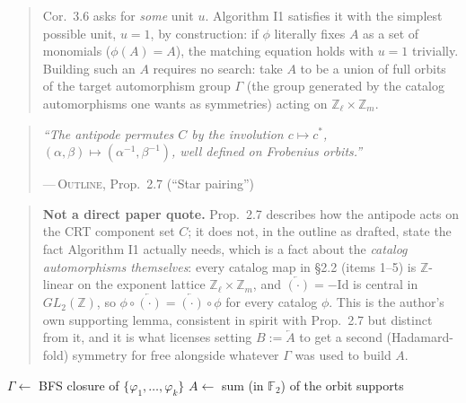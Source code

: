 \documentclass[11pt]{article}
\theoremstyle{plain}
\theoremstyle{definition}
\newenvironment{paperquote}[1]{%
  \def\paperquotecite{#1}%
  \begin{quotation}\noindent\itshape\small
}{%
  \normalfont\par\hfill---\,\textsc{Outline}, \paperquotecite\medskip
  \end{quotation}
}
\newcommand{\pq}[2]{\begin{paperquote}{#1}#2\end{paperquote}}
\newenvironment{mynote}{%
  \begin{quotation}\noindent\small
}{%
  \end{quotation}
}
\begin{document}
\begin{mynote}
Cor.\ 3.6 asks for \emph{some} unit $u$. Algorithm I1 satisfies it with the
simplest possible unit, $u=1$, by construction: if $\phi$ literally fixes
$A$ as a set of monomials ($\phi(A)=A$), the matching equation holds with
$u=1$ trivially. Building such an $A$ requires no search: take $A$ to be a
union of full orbits of the target automorphism group $\Gamma$ (the group
generated by the catalog automorphisms one wants as symmetries) acting on
$\mathbb{Z}_\ell\times\mathbb{Z}_m$.
\end{mynote}

\pq{Prop.\ 2.7 (``Star pairing'')}{%
``The antipode permutes $C$ by the involution $c\mapsto c^*$, $(\alpha,
\beta)\mapsto(\alpha^{-1},\beta^{-1})$, well defined on Frobenius
orbits.''
}

\begin{mynote}
\textbf{Not a direct paper quote.} Prop.\ 2.7 describes how the antipode
acts on the CRT component set $C$; it does not, in the outline as drafted,
state the fact Algorithm I1 actually needs, which is a fact about the
\emph{catalog automorphisms themselves}: every catalog map in \S2.2 (items
1--5) is $\mathbb{Z}$-linear on the exponent lattice $\mathbb{Z}_\ell\times
\mathbb{Z}_m$, and $\overleftarrow{(\cdot)}=-\mathrm{Id}$ is central in
$GL_2(\mathbb{Z})$, so $\phi\circ\overleftarrow{(\cdot)} =
\overleftarrow{(\cdot)}\circ\phi$ for every catalog $\phi$. This is the
author's own supporting lemma, consistent in spirit with Prop.\ 2.7 but
distinct from it, and it is what licenses setting $B:=\overleftarrow{A}$ to
get a second (Hadamard-fold) symmetry for free alongside whatever $\Gamma$
was used to build $A$.
\end{mynote}

\begin{algorithm}[H]
\caption{Orbit-closure construction (constructive Cor.\ 3.6, $u=1$)}
$\Gamma \gets$ BFS closure of $\{\varphi_1,\ldots,\varphi_k\}$ 
$A \gets$ sum (in $\mathbb F_2$) of the orbit supports\;
\end{algorithm}
\end{document}

